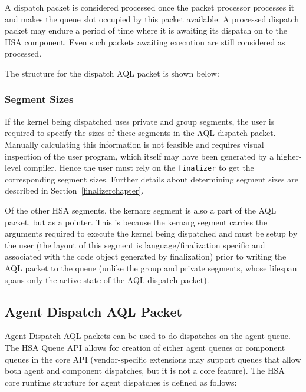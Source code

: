 \documentclass{book}
\begin{document}
A dispatch packet is considered processed once the packet processor
processes it and makes the queue slot occupied by this packet
available. A processed dispatch packet may endure a period of time
where it is awaiting its dispatch on to the HSA component. Even such
packets awaiting execution are still considered as processed.

The structure for the dispatch AQL packet is shown below:



\hypertarget{segment_sizes}{}\subsubsection{Segment
Sizes}\label{segment_sizes}
If the kernel being dispatched uses private and group segments, the
user is required to specify the sizes of these segments in the AQL
dispatch packet. Manually calculating this information is not
feasible and requires visual inspection of the user program, which itself
may have been generated by a higher-level compiler. Hence the user
must rely on the \texttt{finalizer} to get the corresponding segment
sizes. Further details about determining segment sizes are described in
Section~\ref{finalizerchapter}.

Of the other HSA segments, the kernarg segment is also a part of
the AQL packet, but as a pointer. This is because the kernarg segment
carries the arguments required to execute the kernel being
dispatched and must be setup by the user (the layout of this
segment is language/finalization specific and associated with the
code object generated by finalization) prior to writing the AQL
packet to the queue (unlike the group and private segments, whose
lifespan spans only the active state of the AQL dispatch packet).

\hypertarget{agent_packet}{}\subsection{Agent Dispatch AQL
Packet}\label{agent_packet}
Agent Dispatch AQL packets can be used to do dispatches on the agent
queue. The HSA Queue API allows for creation of either agent queues
or component queues in the core API (vendor-specific extensions may
support queues that allow both agent and component dispatches, but
it is not a core feature). The HSA core runtime structure for agent
dispatches is defined as follows:
\end{document}
